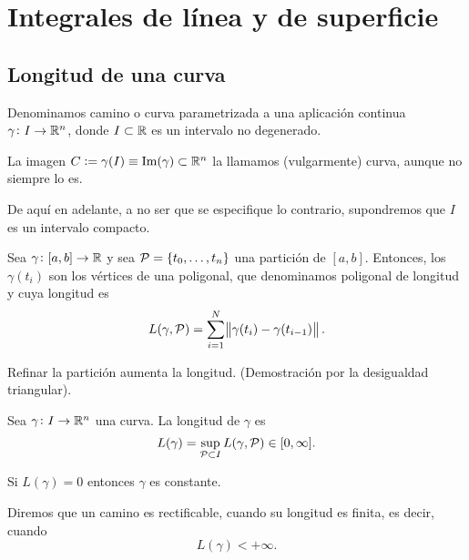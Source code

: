 \chapter{Integrales de línea y de superficie}

\section{Longitud de una curva}

\begin{defi}[camino] 
    Denominamos camino o curva parametrizada a una aplicación continua $\gamma \colon I \to \mathbb{R}^n$, donde
    $I \subset \mathbb{R}$ es un intervalo no degenerado.

    La imagen $C := \gamma(I) \equiv \operatorname{Im}(\gamma) \subset \mathbb{R}^n$ la llamamos (vulgarmente) curva, aunque no
    siempre lo es.
\end{defi}

\begin{obs}
    De aquí en adelante, a no ser que se especifique lo contrario, supondremos que $I$ es un intervalo compacto.
\end{obs}

\begin{defi}
    Sea $\gamma \colon [a, b] \to \mathbb{R}$ y  sea $\mathcal{P} = \left\{t_0, \dots, t_n\right\}$ una partición de $[a, b]$.
    Entonces, los $\gamma(t_i)$ son los v\'ertices de una poligonal, que denominamos poligonal de longitud y cuya longitud es
    \[
        L(\gamma, \mathcal{P}) = \sum^N_{i=1} \norm{\gamma(t_i) - \gamma(t_{i-1})}.
    \]
\end{defi}
\begin{obs}
    Refinar la partición aumenta la longitud. (Demostración por la desigualdad triangular).
\end{obs}

\begin{defi}
    Sea $\gamma \colon I \to \mathbb{R}^n$ una curva. La longitud de $\gamma$ es
    \[
        L(\gamma) = \sup_{\mathcal{P} \subset I} L(\gamma, \mathcal{P}) \in [0, \infty].
    \]
\end{defi}

\begin{obs}
    Si $L(\gamma) = 0$ entonces $\gamma$ es constante.
\end{obs}

\begin{defi}
    Diremos que un camino es rectificable, cuando su longitud es finita, es decir, cuando
    \[
        L(\gamma) < +\infty.
    \]
\end{defi}

